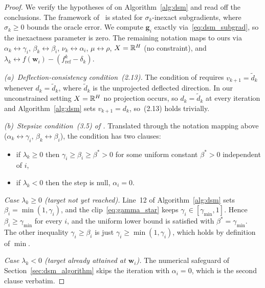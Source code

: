 \begin{proof}
We verify the hypotheses of \cite[Theorem~3.7]{dantonio2009deflected} on Algorithm~\ref{alg:dsm} and read off the conclusions. The framework of~\cite{dantonio2009deflected} is stated for $\sigma_k$-inexact subgradients, where $\sigma_k \ge 0$ bounds the oracle error. We compute $\mathbf{g}_i$ exactly via~\eqref{eq:dsm_subgrad}, so the inexactness parameter is zero. The remaining notation maps to ours via $\alpha_k \leftrightarrow \gamma_i$, $\beta_k \leftrightarrow \beta_i$, $\nu_k \leftrightarrow \alpha_i$, $\mu \leftrightarrow \rho$, $X = \mathbb{R}^H$ (no constraint), and $\lambda_k \leftrightarrow f(\mathbf{w}_i) - (f^k_{\mathrm{ref}} - \delta_k)$.

\emph{(a)~Deflection-consistency condition~(2.13).} The condition of \cite[Lemma~2.4]{dantonio2009deflected} requires $v_{k+1} = \tilde d_k$ whenever $d_k = \tilde d_k$, where $\tilde d_k$ is the unprojected deflected direction. In our unconstrained setting $X = \mathbb{R}^H$ no projection occurs, so $d_k = \tilde d_k$ at every iteration and Algorithm~\ref{alg:dsm} sets $v_{k+1} = d_k$, so~(2.13) holds trivially.

\emph{(b)~Stepsize condition~(3.5) of \cite{dantonio2009deflected}.} Translated through the notation mapping above ($\alpha_k \leftrightarrow \gamma_i$, $\beta_k \leftrightarrow \beta_i$), the condition has two clauses:
\begin{itemize}
\item if $\lambda_k \ge 0$ then $\gamma_i \ge \beta_i \ge \beta^* > 0$ for some uniform constant $\beta^* > 0$ independent of $i$,
\item if $\lambda_k < 0$ then the step is null, $\alpha_i = 0$.
\end{itemize}

\emph{Case $\lambda_k \ge 0$ (target not yet reached).} Line~12 of Algorithm~\ref{alg:dsm} sets $\beta_i = \min(1, \gamma_i)$, and the clip~\eqref{eq:gamma_star} keeps $\gamma_i \in [\gamma_{\min}, 1]$. Hence $\beta_i \ge \gamma_{\min}$ for every $i$, and the uniform lower bound is satisfied with $\beta^* = \gamma_{\min}$. The other inequality $\gamma_i \ge \beta_i$ is just $\gamma_i \ge \min(1, \gamma_i)$, which holds by definition of $\min$.

\emph{Case $\lambda_k < 0$ (target already attained at $\mathbf{w}_i$).} The numerical safeguard of Section~\ref{sec:dsm_algorithm} skips the iteration with $\alpha_i = 0$, which is the second clause verbatim.


\end{proof}
